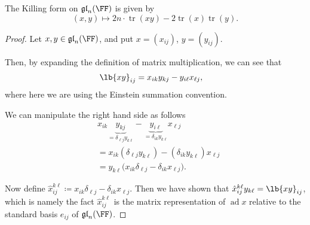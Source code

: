 \documentclass{article}
\DeclarePairedDelimiter\lb\lbrack\rbrack
\DeclareMathOperator{\tr}{tr}
\DeclareMathOperator{\ad}{ad}
\newcommand*\glalg{\ensuremath{\mathfrak{gl}}}
\begin{document}
\begin{theorem}
    The Killing form on $\glalg_n(\FF)$ is given by
    \[
        (x, y)
        \mapsto
        2n\cdot\tr(xy) - 2\tr(x)\tr(y).
    \]
\end{theorem}
\begin{proof}
    Let $x, y \in \glalg_n(\FF)$, and put $x = (x_{ij})$, $y = (y_{ij})$.

    Then, by expanding the definition of matrix multiplication, we can see that
    \begin{align*}
        \lb{xy}_{ij}
        &=
        x_{ik}
        y_{kj}
        -
        y_{i\ell}x_{\ell j},
    \end{align*}
    where here we are using the Einstein summation convention.

    We can manipulate the right hand side as follows
    \begin{align*}
        &
        x_{ik}
        \underbrace{y_{kj}}_{=\delta_{\ell j}y_{k\ell}}
        -
        \underbrace{y_{i\ell}}_{=\delta_{ik}y_{k\ell}}
        x_{\ell j}
        \\
        &=
        x_{ik}
        (\delta_{\ell j}y_{k\ell})
        -
        (\delta_{ik}y_{k\ell})
        x_{\ell j}
        \\
        &=
        y_{k\ell}
        \Big(
            x_{ik}\delta_{\ell j}
            -
            \delta_{ik}x_{\ell j}
        \Big).
    \end{align*}

    Now define $\hat{x}_{ij}^{k\ell} \coloneq x_{ik}\delta_{\ell j} - \delta_{ik} x_{\ell j}$.
    Then we have shown that $\hat{x}_{ij}^{k\ell} y_{k\ell} = \lb{xy}_{ij}$, which is namely the fact $\hat{x}_{ij}^{k\ell}$ is the matrix representation of $\ad x$ relative to the standard basis $e_{ij}$ of $\glalg_n(\FF)$.


\end{proof}
\end{document}
